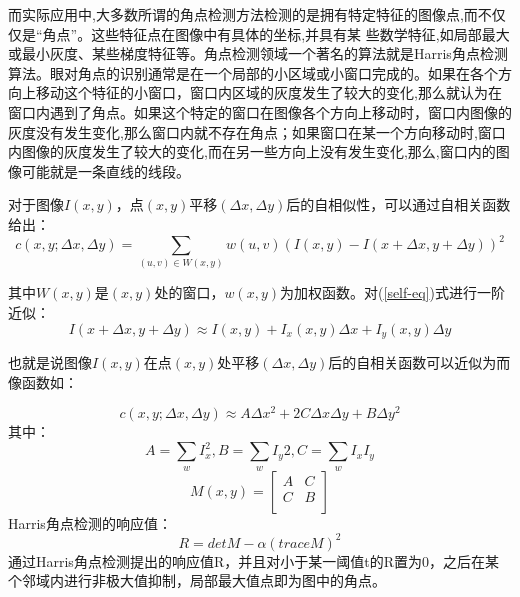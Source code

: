 \documentclass{article}
\begin{document}
而实际应用中,大多数所谓的角点检测方法检测的是拥有特定特征的图像点,而不仅仅是“角点”。这些特征点在图像中有具体的坐标,并具有某
些数学特征,如局部最大或最小灰度、某些梯度特征等。角点检测领域一个著名的算法就是Harris角点检测算法。眼对角点的识别通常是在一个局部的小区域或小窗口完成的。如果在各个方向上移动这个特征的小窗口，窗口内区域的灰度发生了较大的变化,那么就认为在窗口内遇到了角点。如果这个特定的窗口在图像各个方向上移动时，窗口内图像的灰度没有发生变化,那么窗口内就不存在角点；如果窗口在某一个方向移动时,窗口内图像的灰度发生了较大的变化,而在另一些方向上没有发生变化,那么,窗口内的图像可能就是一条直线的线段。

对于图像$I(x,y)$，点$(x,y)$平移$(\Delta x,\Delta y)$后的自相似性，可以通过自相关函数给出：
\begin{equation}
    c(x, y; \Delta x, \Delta y)=\sum_{(u,v)\in W(x,y)}w(u,v)(I(x,y)-I(x+\Delta x, y+\Delta y))^2
    \label{self-eq}
\end{equation}

其中$W(x,y)$是$(x,y)$处的窗口，$w(x,y)$为加权函数。对(\ref{self-eq})式进行一阶近似：
\begin{equation}
    I(x+\Delta x, y+\Delta y)\approx I(x,y)+I_x(x,y)\Delta x+I_y(x,y)\Delta y
\end{equation}

也就是说图像$I(x,y)$在点$(x,y)$处平移$(\Delta x, \Delta y)$后的自相关函数可以近似为而像函数如：
		
\begin{equation}
c(x,y; \Delta x, \Delta y) \approx A\Delta x^2 + 2C\Delta x \Delta y + B\Delta y^2
\end{equation}
其中：
\begin{equation}
A=\sum_{w}I_{x}^{2}, B=\sum_{w}I_{y}{2}, C=\sum_{w}I_{x}I_{y}
\end{equation}
\begin{equation}
M(x,y)=\left[ \begin{array}{ccc}
A & C \\
C & B \\
\end{array} 
\right ]
\end{equation}
Harris角点检测的响应值：
\begin{equation}
R=detM-\alpha (traceM)^2
\end{equation}
通过Harris角点检测提出的响应值R，并且对小于某一阈值t的R置为0，之后在某个邻域内进行非极大值抑制，局部最大值点即为图中的角点。
\end{document}

